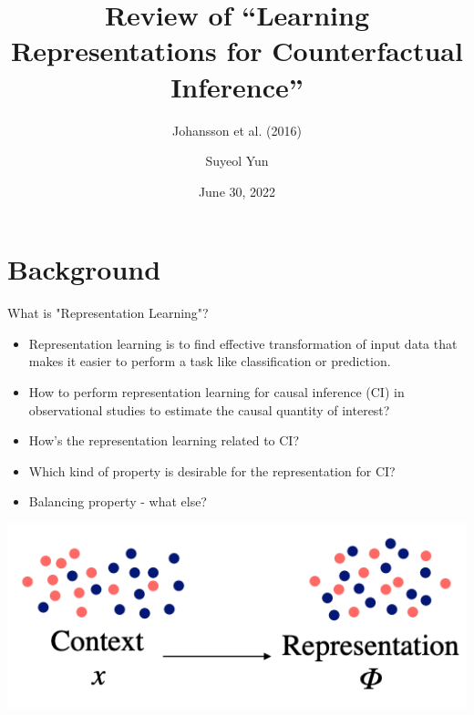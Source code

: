 \documentclass{beamer}
\begin{document}
	\title[]{Review of ``Learning Representations for Counterfactual Inference''}
	\subtitle{Johansson et al. (2016)}
	\author[Suyeol Yun]{Suyeol Yun}
	\date{June 30, 2022}
	\frame{\titlepage}
	\section{Background}
	\begin{frame}{What is "Representation Learning"?}
		\begin{itemize}
			\item Representation learning is to find effective transformation of input data that makes it easier to perform a task like classification or prediction.
			\item How to perform representation learning for causal inference (CI) in observational studies to estimate the causal quantity of interest?
			\item How's the representation learning related to CI?
			\item Which kind of property is desirable for the representation for CI?
			\item Balancing property - what else?
		\end{itemize}
		\centering	\includegraphics[scale=0.7]{./images/balancing.png}
	\end{frame}
\end{document}
